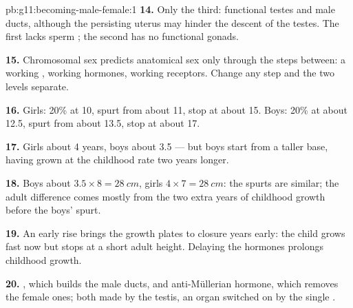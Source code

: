 \begin{solution}{pb:g11:becoming-male-female:1}
\textbf{14.} Only the third: functional testes and male ducts,
although the persisting uterus may hinder the descent of the testes.
The first lacks sperm ; the second has no functional gonads.

\textbf{15.} Chromosomal sex predicts anatomical sex only through the
steps between: a working , working hormones, working receptors.
Change any step and the two levels separate.

\textbf{16.} Girls: 20\% at 10, spurt from about 11, stop at about 15.
Boys: 20\% at about 12.5, spurt from about 13.5, stop at about 17.

\textbf{17.} Girls about 4 years, boys about 3.5 --- but boys start
from a taller base, having grown at the childhood rate two years
longer.

\textbf{18.} Boys about $3.5 \times 8 = \qty{28}{cm}$, girls $4 \times
7 = \qty{28}{cm}$: the spurts are similar; the adult difference comes
mostly from the two extra years of childhood growth before the boys'
spurt.

\textbf{19.} An early rise brings the growth plates to closure years
early: the child grows fast now but stops at a short adult height.
Delaying the hormones prolongs childhood growth.

\textbf{20.} , which builds the male ducts, and
anti-Müllerian hormone, which removes the female ones; both made by
the testis, an organ switched on by the single  .
\end{solution}
